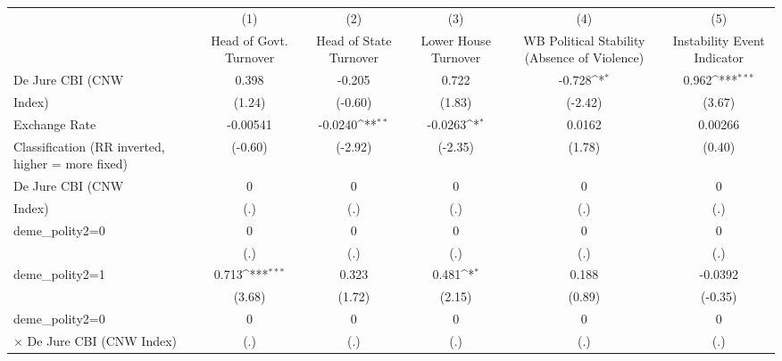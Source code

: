 {
\def\sym#1{\ifmmode^{#1}\else\(^{#1}\)\fi}
\begin{tabular}{l*{5}{c}}
\hline\hline
                    &\multicolumn{1}{c}{(1)}&\multicolumn{1}{c}{(2)}&\multicolumn{1}{c}{(3)}&\multicolumn{1}{c}{(4)}&\multicolumn{1}{c}{(5)}\\
                    &\multicolumn{1}{c}{Head of Govt. Turnover}&\multicolumn{1}{c}{Head of State Turnover}&\multicolumn{1}{c}{Lower House Turnover}&\multicolumn{1}{c}{WB Political Stability (Absence of Violence)}&\multicolumn{1}{c}{Instability Event Indicator}\\
\hline
De Jure CBI (CNW    &       0.398         &      -0.205         &       0.722         &      -0.728\sym{*}  &       0.962\sym{***}\\
Index)              &      (1.24)         &     (-0.60)         &      (1.83)         &     (-2.42)         &      (3.67)         \\
[1em]
Exchange Rate       &    -0.00541         &     -0.0240\sym{**} &     -0.0263\sym{*}  &      0.0162         &     0.00266         \\
Classification (RR inverted, higher = more fixed)&     (-0.60)         &     (-2.92)         &     (-2.35)         &      (1.78)         &      (0.40)         \\
[1em]
De Jure CBI (CNW    &           0         &           0         &           0         &           0         &           0         \\
Index)              &         (.)         &         (.)         &         (.)         &         (.)         &         (.)         \\
[1em]
deme\_polity2=0      &           0         &           0         &           0         &           0         &           0         \\
                    &         (.)         &         (.)         &         (.)         &         (.)         &         (.)         \\
[1em]
deme\_polity2=1      &       0.713\sym{***}&       0.323         &       0.481\sym{*}  &       0.188         &     -0.0392         \\
                    &      (3.68)         &      (1.72)         &      (2.15)         &      (0.89)         &     (-0.35)         \\
[1em]
deme\_polity2=0      &           0         &           0         &           0         &           0         &           0         \\
$\times$ De Jure CBI (CNW Index)&         (.)         &         (.)         &         (.)         &         (.)         &         (.)         \\

\end{tabular}}
